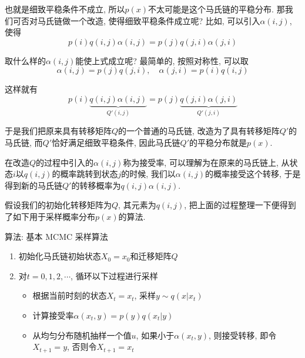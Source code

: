 \documentclass[a4paper,UTF8]{ctexart}
\theoremstyle{plain} \newtheorem{theorem}{定理}[section]
\theoremstyle{plain} \newtheorem{definition}{定义}[section]
\theoremstyle{plain} \newtheorem{lemma}{引理}[section]
\theoremstyle{plain} \newtheorem{proposition}{命题}[section]
\theoremstyle{plain} \newtheorem{example}{例}[section]
\theoremstyle{plain} \newtheorem{remark}{注}[section]
\theoremstyle{plain} \newtheorem{corollary}{推论}[section]
\begin{document}
也就是细致平稳条件不成立, 所以$p(x)$不太可能是这个马氏链的平稳分布. 那我们可否对马氏链做一个改造, 使得细致平稳条件成立呢? 比如, 可以引入$\alpha(i,j)$, 使得
\begin{equation*}
p(i) q(i,j) \alpha(i,j) = p(j) q(j,i) \alpha(j,i)
\end{equation*}

取什么样的$\alpha(i,j)$能使上式成立呢? 最简单的, 按照对称性, 可以取
\begin{equation*}
\alpha(i,j) = p(j) q(j,i), \quad \alpha(j,i) = p(i) q(i,j)
\end{equation*}

这样就有
\begin{equation*}
p(i) \underbrace{q(i,j) \alpha(i,j)}_{Q'(i,j)} = p(j) \underbrace{q(j,i) \alpha(j,i)}_{Q'(j,i)}
\end{equation*}

于是我们把原来具有转移矩阵$Q$的一个普通的马氏链, 改造为了具有转移矩阵$Q'$的马氏链, 而$Q'$恰好满足细致平稳条件, 因此马氏链$Q'$的平稳分布就是$p(x)$.

在改造$Q$的过程中引入的$\alpha(i,j)$称为接受率, 可以理解为在原来的马氏链上, 从状态$i$以$q(i,j)$的概率跳转到状态$j$的时候, 我们以$\alpha(i,j)$的概率接受这个转移, 于是得到新的马氏链$Q'$的转移概率为$q(i,j) \alpha(i,j)$.

假设我们的初始化转移矩阵为$Q$, 其元素为$q(i,j)$, 把上面的过程整理一下便得到了如下用于采样概率分布$p(x)$的算法.

\begin{algorithm}[htb]
\caption{算法: 基本 MCMC 采样算法}

\begin{enumerate}[1.]
\item 初始化马氏链初始状态$X_0 = x_0$和迁移矩阵$Q$ 

\item 对$t = 0,1,2,\cdots$, 循环以下过程进行采样
\begin{itemize}
    \item  根据当前时刻的状态$X_t = x_t$, 采样$y \sim q(x | x_t)$

    \item 计算接受率$\alpha(x_t, y) = p(y) q(x_t | y)$

    \item 从均匀分布随机抽样一个值$u$, 如果小于$\alpha(x_t, y)$, 则接受转移, 即令$X_{t+1} = y$, 否则令$X_{t+1} = x_t$
\end{itemize}
\end{enumerate}

\end{algorithm}
\end{document}
